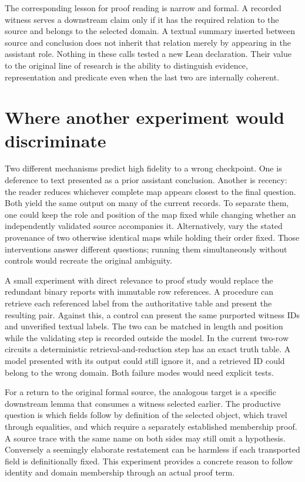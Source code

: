 \documentclass[12pt,letterpaper]{article}
\begin{document}
The corresponding lesson for proof reading is narrow and formal. A recorded witness serves a downstream claim only if it has the required relation to the source and belongs to the selected domain. A textual summary inserted between source and conclusion does not inherit that relation merely by appearing in the assistant role. Nothing in these calls tested a new Lean declaration. Their value to the original line of research is the ability to distinguish evidence, representation and predicate even when the last two are internally coherent.

\clearpage\section{Where another experiment would discriminate}

Two different mechanisms predict high fidelity to a wrong checkpoint. One is deference to text presented as a prior assistant conclusion. Another is recency: the reader reduces whichever complete map appears closest to the final question. Both yield the same output on many of the current records. To separate them, one could keep the role and position of the map fixed while changing whether an independently validated source accompanies it. Alternatively, vary the stated provenance of two otherwise identical maps while holding their order fixed. Those interventions answer different questions; running them simultaneously without controls would recreate the original ambiguity.

A small experiment with direct relevance to proof study would replace the redundant binary reports with immutable row references. A procedure can retrieve each referenced label from the authoritative table and present the resulting pair. Against this, a control can present the same purported witness IDs and unverified textual labels. The two can be matched in length and position while the validating step is recorded outside the model. In the current two-row circuits a deterministic retrieval-and-reduction step has an exact truth table. A model presented with its output could still ignore it, and a retrieved ID could belong to the wrong domain. Both failure modes would need explicit tests.

For a return to the original formal source, the analogous target is a specific downstream lemma that consumes a witness selected earlier. The productive question is which fields follow by definition of the selected object, which travel through equalities, and which require a separately established membership proof. A source trace with the same name on both sides may still omit a hypothesis. Conversely a seemingly elaborate restatement can be harmless if each transported field is definitionally fixed. This experiment provides a concrete reason to follow identity and domain membership through an actual proof term.
\end{document}
